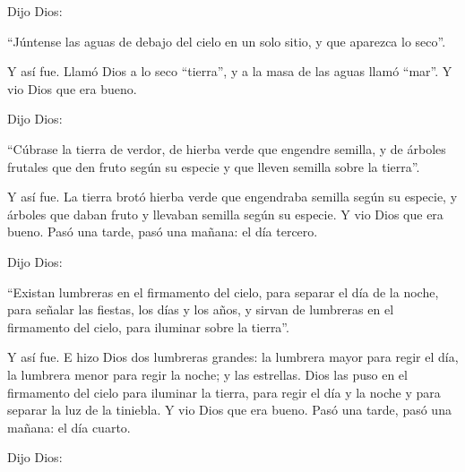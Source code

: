 			\begin{readbody}Dijo Dios: \end{readbody}
			
			\begin{readtalk}“Júntense las aguas de debajo del cielo en un solo sitio, y que aparezca lo seco”. \end{readtalk}
			
			\begin{readbody}Y así fue. Llamó Dios a lo seco “tierra”, y a la masa de las aguas llamó “mar”. Y vio Dios que era bueno. \end{readbody}
			
			\begin{readbody}Dijo Dios: \end{readbody}
			
			\begin{readtalk}“Cúbrase la tierra de verdor, de hierba verde que engendre semilla, y de árboles frutales que den fruto según su especie y que lleven semilla sobre la tierra”. \end{readtalk}
			
			\begin{readbody}Y así fue. La tierra brotó hierba verde que engendraba semilla según su especie, y árboles que daban fruto y llevaban semilla según su especie. Y vio Dios que era bueno. Pasó una tarde, pasó una mañana: el día tercero. \end{readbody}
			
			\begin{readbody}Dijo Dios: \end{readbody}
			
			\begin{readtalk}“Existan lumbreras en el firmamento del cielo, para separar el día de la noche, para señalar las fiestas, los días y los años, y sirvan de lumbreras en el firmamento del cielo, para iluminar sobre la tierra”. \end{readtalk}
			
			\begin{readbody}Y así fue. E hizo Dios dos lumbreras grandes: la lumbrera mayor para regir el día, la lumbrera menor para regir la noche; y las estrellas. Dios las puso en el firmamento del cielo para iluminar la tierra, para regir el día y la noche y para separar la luz de la tiniebla. Y vio Dios que era bueno. Pasó una tarde, pasó una mañana: el día cuarto. \end{readbody}
			
			\begin{readbody}Dijo Dios: \end{readbody}
			
